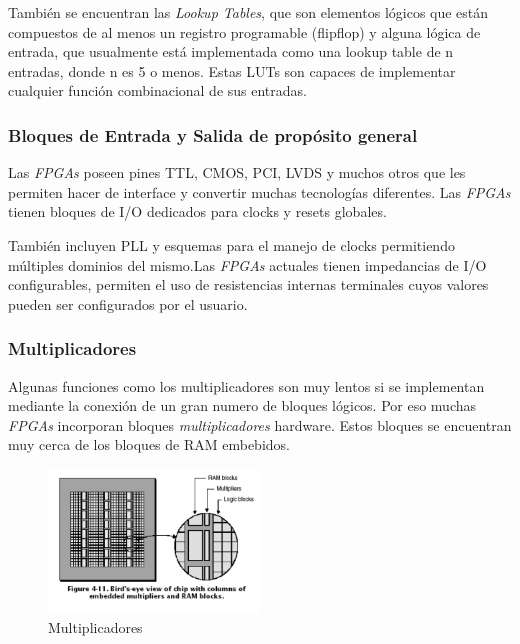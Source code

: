 También se encuentran las \textit{Lookup Tables}, que son elementos lógicos que están compuestos de al menos un registro programable (flip\-flop) y alguna lógica de entrada, que usualmente está implementada como una lookup table de n entradas, donde n es 5 o menos. Estas LUTs son capaces de implementar cualquier función combinacional de sus entradas.

	\subsubsection{Bloques de Entrada y Salida de propósito general}

Las \textit{FPGAs} poseen pines TTL, CMOS, PCI, LVDS y muchos otros que les permiten hacer de interface y convertir muchas tecnologías diferentes. Las \textit{FPGAs} tienen bloques de I/O dedicados para clocks y resets globales.  

También incluyen PLL y esquemas para el manejo de clocks permitiendo múltiples dominios del mismo.Las \textit{FPGAs} actuales tienen impedancias de I/O configurables,  permiten el uso de resistencias internas terminales cuyos valores pueden ser configurados por el usuario.

\subsubsection{Multiplicadores}

Algunas funciones como los multiplicadores son muy lentos si se implementan mediante la conexión de un gran numero de bloques lógicos. Por eso muchas \textit{FPGAs} incorporan bloques \textit{multiplicadores} hardware. Estos bloques se encuentran muy cerca de los bloques de RAM embebidos. 

\begin{figure}[h!]
 \begin{center}
 \includegraphics[width=0.5\textwidth,keepaspectratio=true]{./images/multram}
  \caption{Multiplicadores}
  \label{fig:esquema}
 \end{center}
\end{figure}

